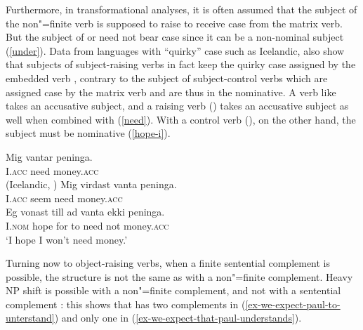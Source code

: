 \documentclass[output=paper
	        ,collection
	        ,collectionchapter
 	        ,biblatex
                ,babelshorthands
                ,newtxmath
                ,draftmode
                ,colorlinks, citecolor=brown
]{langscibook}
\begin{document}
\eal
{}
\zl
\eal
{}
\zl

Furthermore, in transformational analyses, it is often assumed that the subject of the non"=finite verb  is supposed to raise to receive case from the matrix verb.
 But the subject of  or  need not bear case  since it can be a non-nominal subject (\ref{under}).
Data from languages with ``quirky'' case such as Icelandic, also show that subjects of subject-raising verbs in fact keep the quirky case assigned by the embedded verb  \citep{Zaenenetal1985}, contrary to the subject of subject-control verbs which are assigned case by the matrix verb and are thus in the nominative. A verb like  takes an accusative subject, and a raising verb () takes an accusative subject as well when combined with  (\ref{need}). With a control verb (), on the other hand, the subject must be nominative (\ref{hope-i}).

\eal 
\gll Mig            vantar peninga. \\
     I.\textsc{acc} need money.\textsc{acc} \\(Icelandic, \citealp[138--139]{PollardandSag1994})
\ex 
\gll Mig virdast vanta peninga. \label{need} \\
     I.\textsc{acc} seem need money.\textsc{acc} \\
\ex 
\gll Eg vonast till ad vanta ekki peninga. \label{hope-i} \\
     I.\textsc{nom} hope for to need not money.\textsc{acc} \\
\glt `I hope I won't need money.'
\zl

Turning now to object-raising verbs, when a finite sentential complement is possible, the structure
is not the same as  with a non"=finite complement. Heavy NP shift is possible with a non"=finite
complement, and not with a sentential complement \citet[]{Bresnan82c} \citet{PollardandSag1994}: this shows that  has two complements in (\ref{ex-we-expect-paul-to-unterstand}) and only one in (\ref{ex-we-expect-that-paul-understands}).

\eal
{}
\zl
\end{document}
